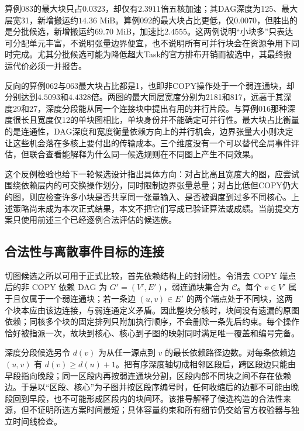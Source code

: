 

算例083的最大块只占$0.0323$，却仅有$2.3911$倍五核加速；其DAG深度为125、最大层宽31，新增搬运约$14.36$ MiB。算例092的最大块占比更低，仅$0.0070$，但胜出的是分批候选，新增搬运约$69.70$ MiB，加速比$2.4555$。这两例说明“小块多”只表达可分配单元丰富，不说明张量边界便宜，也不说明所有可并行块会在资源争用下同时完成。尤其分批候选可能为降低超大Task的官方排布开销而被选中，其最终搬运代价必须一并报告。

反向的算例062与063最大块占比都是1，也即非COPY操作处于一个弱连通块，却分别达到$4.5093$和$4.4328$倍。两图的最大同层宽度分别为2181和817，远高于其深度29和27，深度分段能从同一个连接块中提出有用的并行片段。与算例016那种深度很长且宽度仅12的单块图相比，单块身份并不能确定可并行性。最大块占比衡量的是连通性，DAG深度和宽度衡量依赖方向上的并行机会，边界张量大小则决定让这些机会落在多核上要付出的传输成本。三个维度没有一个可以替代全局事件评估，但联合查看能解释为什么同一候选规则在不同图上产生不同效果。

这个反例检验也给下一轮候选设计指出具体方向：对占比高且宽度大的图，应尝试围绕依赖层内的可交换操作划分，同时限制边界张量总量；对占比低但COPY仍大的图，则应检查许多小块是否共享同一张量输入、是否被调度到过多不同核心。上述策略尚未成为本次正式结果，本文不把它们写成已验证算法或成绩。当前提交方案只使用前述三个已经逐例合法评估的候选族。

\subsection{合法性与离散事件目标的连接}

切图候选之所以可用于正式比较，首先依赖结构上的封闭性。令消去 COPY 端点后的非 COPY 依赖 DAG 为 $G'=(V',E')$，弱连通块集合为 $\mathcal C$。每个 $v\in V'$ 属于且仅属于一个弱连通块；若一条边 $(u,v)\in E'$ 的两个端点处于不同块，这两个块本应由该边连接，与弱连通定义矛盾。因此整块分核时，块间没有遗漏的原图依赖；同核多个块的固定排列只附加执行顺序，不会删除一条先后约束。每个操作恰好被指派一次，故块到核心、核心到子图的映射同时满足唯一覆盖和编号完备。

深度分段候选另令 $d(v)$ 为从任一源点到 $v$ 的最长依赖路径边数。对每条依赖边 $(u,v)$ 有 $d(v)\geq d(u)+1$。把有序深度轴切成相邻区段后，跨区段边只能由早段指向晚段；同一区段内再按弱连通块分割，区段内部不同块之间不存在依赖边。于是以“区段、核心”为子图并按区段序编号时，任何收缩后的边都不可能由晚段回到早段，也不可能形成区段内的块间环。该推导解释了候选构造的合法性来源，但不证明所选方案时间最短；具体容量约束和所有细节仍交给官方校验器与独立时间线检查。

